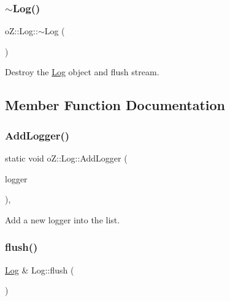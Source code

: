 \subsubsection{\texorpdfstring{$\sim$Log()}{~Log()}}
{\footnotesize\ttfamily o\+Z\+::\+Log\+::$\sim$\+Log (\begin{DoxyParamCaption}\item[{void}]{ }\end{DoxyParamCaption})\hspace{0.3cm}{\ttfamily [inline]}}



Destroy the \mbox{\hyperlink{classo_z_1_1_log}{Log}} object and flush stream. 



\subsection{Member Function Documentation}
\mbox{\label{classo_z_1_1_log_a09f81a16467abe5e5f38d4caf9d9e738}} 
\subsubsection{\texorpdfstring{AddLogger()}{AddLogger()}}
{\footnotesize\ttfamily static void o\+Z\+::\+Log\+::\+Add\+Logger (\begin{DoxyParamCaption}\item[{\mbox{\hyperlink{namespaceo_z_aaa2fbabbfafc6616a7e69651b62a3d4e}{Logger\+Ptr}}}]{logger }\end{DoxyParamCaption})\hspace{0.3cm}{\ttfamily [inline]}, {\ttfamily [static]}}



Add a new logger into the list. 

\mbox{\label{classo_z_1_1_log_a41c8972eca682eb2701126b43a2f9099}} 
\subsubsection{\texorpdfstring{flush()}{flush()}}
{\footnotesize\ttfamily \mbox{\hyperlink{classo_z_1_1_log}{Log}} \& Log\+::flush (\begin{DoxyParamCaption}\item[{void}]{ }\end{DoxyParamCaption})}



